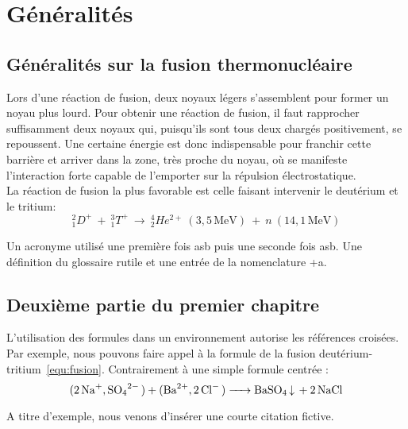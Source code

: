 \chapter{Généralités}
\chaptertoc{}

\section{Généralités sur la fusion thermonucléaire}

	Lors d'une réaction de fusion, deux noyaux légers s'assemblent pour former un noyau plus lourd. Pour obtenir une réaction de fusion, il faut rapprocher suffisamment deux noyaux qui, puisqu'ils sont tous deux chargés positivement, se repoussent. Une certaine énergie est donc indispensable pour franchir cette barrière et arriver dans la zone, très proche du noyau, où se manifeste l'interaction forte capable de l'emporter sur la répulsion électrostatique.
	\\ %
	La réaction de fusion la plus favorable est celle faisant intervenir le deutérium et le tritium:
	\begin{equation}
		_{1}^{2}D^{+}~+~_{1}^{3}T^{+}~\rightarrow ~_{2}^{4}He^{2+}~(3,5\,\textrm{MeV})~+~n~(14,1\,\textrm{MeV})
	    \label{equ:fusion}
	\end{equation}

	\noindent %
	\lipsum[2]
	Un acronyme utilisé une première fois \gls{asb} puis une seconde fois \gls{asb}. Une définition du glossaire \gls{rutile} et une entrée de la nomenclature \gls{+a}.

\section{Deuxième partie du premier chapitre}

	\lipsum[2]

	L'utilisation des formules dans un environnement autorise les références croisées. Par exemple, nous pouvons faire appel à la formule de la fusion deutérium-tritium~\ref{equ:fusion}. Contrairement à une simple formule centrée :
	$$\ce{(2Na+,SO4^2- ) + (Ba^2+, 2Cl- ) -> BaSO4 v + 2NaCl}$$

	\lipsum[9]

	\begin{displayquote}
	\lipsum[10]
	\end{displayquote}

	A titre d'exemple, nous venons d'insérer une courte citation fictive.